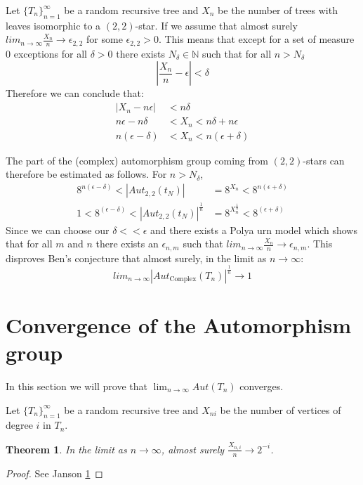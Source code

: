 \documentclass[oneside]{book} %
\newtheorem{thm}{Theorem}[section]
\theoremstyle{definition}
\numberwithin{equation}{section}
\begin{document}
 Let $\{T_n\}_{n=1}^{\infty}$ be a random recursive tree and $X_{n}$ be the number of trees with leaves  isomorphic to a $(2,2)$-star.
 If we assume that almost surely $lim_{n \rightarrow \infty} \frac{X_n}{n} \rightarrow \epsilon_{2,2}$ for some $\epsilon_{2,2}> 0$.  This means that except for a set of measure 0 exceptions for all $\delta > 0$ there exists $N_\delta \in \mathbb{N}$ such that for all $n >N_\delta$ 
 \[ | \frac{X_n}{n}  - \epsilon| < \delta\]
 Therefore we can conclude that:
 \begin{align}
  |X_n  - n\epsilon| &< n \delta \\
 n\epsilon - n\delta  &< X_n < n \delta + n\epsilon \\
n(\epsilon - \delta) &< X_n < n(\epsilon + \delta)  
 \end{align}


 
 The part of the (complex) automorphism group coming from $(2,2)$-stars can therefore be estimated as follows.  For $n >N_\delta$, 
 \begin{align}
 8^{n(\epsilon - \delta)}<|Aut_{2,2}(t_N)| & = 8^{X_n} < 8^{ n(\epsilon + \delta) } \\
 1 < 8^{(\epsilon - \delta)}<|Aut_{2,2}(t_N)|^{\frac{1}{n}} & = 8^{X^{\frac{1}{n}}_n} < 8^{ (\epsilon + \delta) }
 \end{align}
Since we can choose our $\delta << \epsilon$ and there exists a Polya urn model which shows that for all $m$ and $n$ there exists an $\epsilon_{n,m}$ such that $lim_{n \rightarrow \infty} \frac{X_n}{n} \rightarrow \epsilon_{n,m}$. This disproves Ben's conjecture that almost surely, in the limit as $n \rightarrow \infty$: 
\[lim_{n \rightarrow \infty}  |Aut_{\text{Complex}}(T_n)|^{\frac{1}{n}} \rightarrow 1\]
 
\section{Convergence of the Automorphism group}%
 
 In this section we will prove that $\lim_{n \rightarrow \infty} Aut(T_n)$ converges.   
 
 Let $\{T_n\}_{n=1}^{\infty}$ be a random recursive tree and $X_{ni}$ be the number of vertices of degree $i$ in $T_n$.
 
\begin{thm}
 In the limit as $n \rightarrow \infty$, almost surely $\frac{X_{n,i}}{n} \rightarrow 2^{-i}$. 
\end{thm}
\begin{proof}
 See Janson \ref{}
\end{proof}
\end{document}
